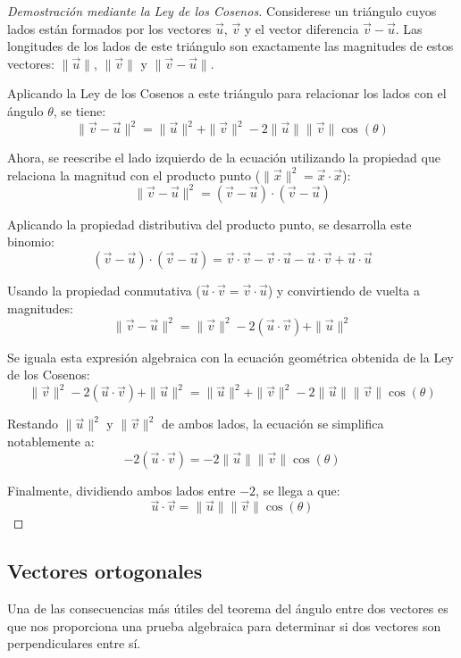\begin{proof}[Demostración mediante la Ley de los Cosenos]

Considerese un triángulo cuyos lados están formados por los vectores $\vec{u}$, $\vec{v}$ y el vector diferencia $\vec{v} - \vec{u}$. Las longitudes de los lados de este triángulo son exactamente las magnitudes de estos vectores: $\|\vec{u}\|$, $\|\vec{v}\|$ y $\|\vec{v} - \vec{u}\|$.

Aplicando la Ley de los Cosenos a este triángulo para relacionar los lados con el ángulo $\theta$, se tiene:
\[ \|\vec{v} - \vec{u}\|^2 = \|\vec{u}\|^2 + \|\vec{v}\|^2 - 2\|\vec{u}\|\|\vec{v}\|\cos(\theta) \]

Ahora, se reescribe el lado izquierdo de la ecuación utilizando la propiedad que relaciona la magnitud con el producto punto ($\|\vec{x}\|^2 = \vec{x} \cdot \vec{x}$):
\[ \|\vec{v} - \vec{u}\|^2 = (\vec{v} - \vec{u}) \cdot (\vec{v} - \vec{u}) \]

Aplicando la propiedad distributiva del producto punto, se desarrolla este binomio:
\[ (\vec{v} - \vec{u}) \cdot (\vec{v} - \vec{u}) = \vec{v} \cdot \vec{v} - \vec{v} \cdot \vec{u} - \vec{u} \cdot \vec{v} + \vec{u} \cdot \vec{u} \]

Usando la propiedad conmutativa ($\vec{u} \cdot \vec{v} = \vec{v} \cdot \vec{u}$) y convirtiendo de vuelta a magnitudes:
\[ \|\vec{v} - \vec{u}\|^2 = \|\vec{v}\|^2 - 2(\vec{u} \cdot \vec{v}) + \|\vec{u}\|^2 \]

Se iguala esta expresión algebraica con la ecuación geométrica obtenida de la Ley de los Cosenos:
\[ \|\vec{v}\|^2 - 2(\vec{u} \cdot \vec{v}) + \|\vec{u}\|^2 = \|\vec{u}\|^2 + \|\vec{v}\|^2 - 2\|\vec{u}\|\|\vec{v}\|\cos(\theta) \]

Restando $\|\vec{u}\|^2$ y $\|\vec{v}\|^2$ de ambos lados, la ecuación se simplifica notablemente a:
\[ -2(\vec{u} \cdot \vec{v}) = -2\|\vec{u}\|\|\vec{v}\|\cos(\theta) \]

Finalmente, dividiendo ambos lados entre $-2$, se llega a que:
\[ \vec{u} \cdot \vec{v} = \|\vec{u}\|\|\vec{v}\|\cos(\theta) \]
\end{proof}

\subsection{Vectores ortogonales}

Una de las consecuencias más útiles del teorema del ángulo entre dos vectores es que nos proporciona una prueba algebraica para determinar si dos vectores son perpendiculares entre sí.

